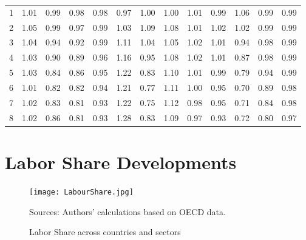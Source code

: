 \documentclass[11pt]{article}
\begin{document}
\begin{appendices}
\begin{table}[htbp]
\begin{tabular}{c|cccc|cccc|cccc}
    \midrule
    1     & 1.01  & 0.99  & 0.98  & 0.98  & 0.97  & 1.00  & 1.00  & 1.01  & 0.99  & 1.06  & 0.99  & 0.99 \\
    2     & 1.05  & 0.99  & 0.97  & 0.99  & 1.03  & 1.09  & 1.08  & 1.01  & 1.02  & 1.02  & 0.99  & 0.99 \\
    3     & 1.04  & 0.94  & 0.92  & 0.99  & 1.11  & 1.04  & 1.05  & 1.02  & 1.01  & 0.94  & 0.98  & 0.99 \\
    4     & 1.03  & 0.90  & 0.89  & 0.96  & 1.16  & 0.95  & 1.08  & 1.02  & 1.01  & 0.87  & 0.98  & 0.99 \\
    5     & 1.03  & 0.84  & 0.86  & 0.95  & 1.22  & 0.83  & 1.10  & 1.01  & 0.99  & 0.79  & 0.94  & 0.99 \\
    6     & 1.01  & 0.82  & 0.82  & 0.94  & 1.21  & 0.77  & 1.11  & 1.00  & 0.95  & 0.70  & 0.89  & 0.98 \\
    7     & 1.02  & 0.83  & 0.81  & 0.93  & 1.22  & 0.75  & 1.12  & 0.98  & 0.95  & 0.71  & 0.84  & 0.98 \\
    8     & 1.02  & 0.86  & 0.81  & 0.93  & 1.28  & 0.83  & 1.09  & 0.97  & 0.93  & 0.72  & 0.80  & 0.97 \\
    \bottomrule
    \end{tabular}%
  \label{condulc}%
\end{table}%
\clearpage

\pagebreak
\section{Labor Share Developments}
\label{AppendixLaborShare}


\begin{figure}[!htbp]
\begin{center}
\caption{Labor Share across countries and sectors}\label{fig:LS}
\texttt{[image: LabourShare.jpg]}
\begin{minipage}{\textwidth} {\footnotesize
Sources: Authors' calculations based on OECD data.
\par}
\end{minipage}
\end{center}
\end{figure}

\clearpage
\pagebreak




\end{appendices}
\end{document}
